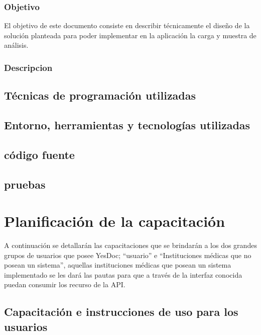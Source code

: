 \documentclass[a4paper,12pt]{article}
\begin{document}
\subsubsection{Objetivo}
El objetivo de este documento consiste en describir técnicamente el diseño de la solución planteada para poder implementar en la aplicación la carga y muestra de análisis.

\subsubsection{Descripcion}%



\subsection{Técnicas de programación utilizadas}
\subsection{Entorno, herramientas y tecnologías utilizadas}
\subsection{código fuente}
\subsection{pruebas}













\section{Planificación de la capacitación}
A continuación se detallarán las capacitaciones que se brindarán a los dos grandes grupos de usuarios que posee YesDoc; ``usuario'' e ``Instituciones médicas que no posean un sistema'', aquellas instituciones médicas que posean un sistema implementado se les dará las pautas para que a través de la interfaz conocida puedan consumir los recurso de la API.

\subsection{Capacitación e instrucciones de uso para los usuarios}
\end{document}
